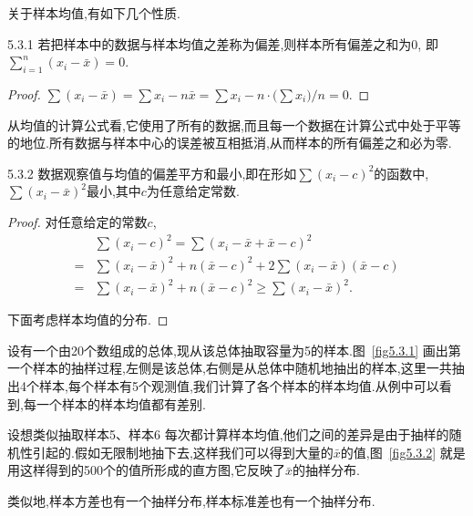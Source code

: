 关于样本均值,有如下几个性质.
\begin{theorem}{}{5.3.1}
若把样本中的数据与样本均值之差称为偏差,则样本所有偏差之和为$0$, 即$\sum_{i=1}^n(x_i-\bar x)=0$.
\end{theorem}
\begin{proof}
$\sum(x_i-\bar x)=\sum x_i-n\bar x=\sum x_i-n\cdot\big(\sum x_i\big)/n=0$.
\end{proof}

从均值的计算公式看,它使用了所有的数据,而且每一个数据在计算公式中处于平等的地位.所有数据与样本中心的误差被互相抵消,从而样本的所有偏差之和必为零.
\begin{theorem}{}{5.3.2}
数据观察值与均值的偏差平方和最小,即在形如$\sum(x_i-c)^2$的函数中, $\sum(x_i-\bar x)^2$最小,其中$c$为任意给定常数.
\end{theorem}
\begin{proof}
对任意给定的常数$c$,
\begin{align*}
{}&\sum(x_i-c)^2=\sum(x_i-\bar x+\bar x-c)^2\\
=&\sum(x_i-\bar x)^2+n(\bar x-c)^2+
2\sum(x_i-\bar x)(\bar x-c)\\
=&\sum(x_i-\bar x)^2+n(\bar x-c)^2\geq\sum(x_i-\bar x)^2.
\end{align*}

下面考虑样本均值的分布.
\end{proof}
\begin{example}\label{exam:5.3.2}
设有一个由20个数组成的总体,现从该总体抽取容量为5的样本.图~\ref{fig5.3.1} 画出第一个样本的抽样过程,左侧是该总体,右侧是从总体中随机地抽出的样本,这里一共抽出4个样本,每个样本有5个观测值,我们计算了各个样本的样本均值.从例中可以看到,每一个样本的样本均值都有差别.
\end{example}

设想类似抽取样本5、样本6  每次都计算样本均值,他们之间的差异是由于抽样的随机性引起的.假如无限制地抽下去,这样我们可以得到大量的$\bar x$的值,图~\ref{fig5.3.2} 就是用这样得到的500个的值所形成的直方图,它反映了$\bar x$的抽样分布.

类似地,样本方差也有一个抽样分布,样本标准差也有一个抽样分布.

